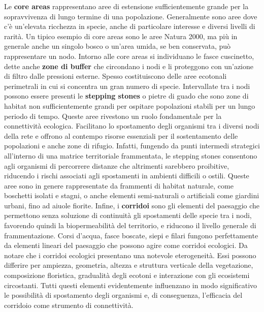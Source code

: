\documentclass[
  a4paper,
]{book}
\begin{document}
Le \textbf{core areas} rappresentano aree di estensione sufficientemente
grande per la sopravvivenza di lungo termine di una popolazione.
Generalmente sono aree dove c'è un'elevata ricchezza in specie, anche di
particolare interesse e diversi livelli di rarità. Un tipico esempio di
core areas sono le aree Natura 2000, ma più in generale anche un singolo
bosco o un'area umida, se ben conservata, può rappresentare un nodo.
Intorno alle core areas si individuano le fasce cuscinetto, dette anche
\textbf{zone di buffer} che circondano i nodi e li proteggono con un'azione
di filtro dalle pressioni esterne. Spesso costituiscono delle aree
ecotonali perimetrali in cui si concentra un gran numero di specie.
Intervallate tra i nodi possono essere presenti le \textbf{stepping stones} o
pietre di guado che sono zone di habitat non sufficientemente grandi per
ospitare popolazioni stabili per un lungo periodo di tempo. Queste aree
rivestono un ruolo fondamentale per la connettività ecologica.
Facilitano lo spostamento degli organismi tra i diversi nodi della rete
e offrono al contempo risorse essenziali per il sostentamento delle
popolazioni e anche zone di rifugio. Infatti, fungendo da punti
intermedi strategici all'interno di una matrice territoriale
frammentata, le stepping stones consentono agli organismi di percorrere
distanze che altrimenti sarebbero proibitive, riducendo i rischi
associati agli spostamenti in ambienti difficili o ostili. Queste aree
sono in genere rappresentate da frammenti di habitat naturale, come
boschetti isolati e stagni, o anche elementi semi-naturali o artificiali
come giardini urbani, fino ad aiuole fiorite. Infine, i \textbf{corridoi}
sono gli elementi del paesaggio che permettono senza soluzione di
continuità gli spostamenti delle specie tra i nodi, favorendo quindi la
biopermeabilità del territorio, e riducono il livello generale di
frammentazione. Corsi d'acqua, fasce boscate, siepi e filari fungono
perfettamente da elementi lineari del paesaggio che possono agire come
corridoi ecologici. Da notare che i corridoi ecologici presentano una
notevole eterogeneità. Essi possono differire per ampiezza, geometria,
altezza e struttura verticale della vegetazione, composizione
floristica, gradualità degli ecotoni e interazione con gli ecosistemi
circostanti. Tutti questi elementi evidentemente influenzano in modo
significativo le possibilità di spostamento degli organismi e, di
conseguenza, l'efficacia del corridoio come strumento di connettività.
\end{document}
